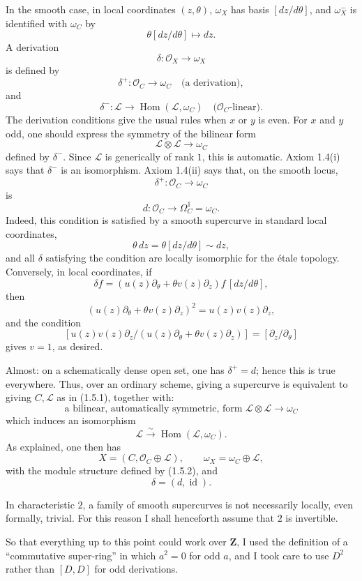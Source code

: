 \documentclass[11pt]{article}
\newcommand{\cO}{\mathcal O}
\newcommand{\cL}{\mathcal L}
\newcommand{\Hom}{\operatorname{Hom}}
\begin{document}
In the smooth case, in local coordinates $(z,\theta)$, $\omega_X$ has basis $[dz/d\theta]$, and $\omega_X^-$ is identified with $\omega_C$ by
\[
  \theta[dz/d\theta]\longmapsto dz.
\]
A derivation
\[
  \delta:\cO_X\longrightarrow\omega_X
\]
is defined by
\[
  \delta^+:\cO_C\longrightarrow\omega_C \quad\text{(a derivation)},
\]
and
\[
  \delta^-:\cL\longrightarrow\Hom(\cL,\omega_C)
  \quad\text{($\cO_C$-linear)}.
\]
The derivation conditions give the usual rules when $x$ or $y$ is even. For $x$ and $y$ odd, one should express the symmetry of the bilinear form
\[
  \cL\otimes\cL\longrightarrow\omega_C
\]
defined by $\delta^-$. Since $\cL$ is generically of rank $1$, this is automatic. Axiom 1.4(i) says that $\delta^-$ is an isomorphism. Axiom 1.4(ii) says that, on the smooth locus,
\[
  \delta^+:\cO_C\longrightarrow\omega_C
\]
is
\[
  d:\cO_C\longrightarrow\Omega_C^1=\omega_C.
\]
Indeed, this condition is satisfied by a smooth supercurve in standard local coordinates,
\[
  \theta\,dz=\theta[dz/d\theta]\sim dz,
\]
and all $\delta$ satisfying the condition are locally isomorphic for the étale topology. Conversely, in local coordinates, if
\[
  \delta f=(u(z)\partial_\theta+\theta v(z)\partial_z)f\,[dz/d\theta],
\]
then
\[
  (u(z)\partial_\theta+\theta v(z)\partial_z)^2=u(z)v(z)\partial_z,
\]
and the condition
\[
  [u(z)v(z)\partial_z/(u(z)\partial_\theta+\theta v(z)\partial_z)]=[\partial_z/\partial_\theta]
\]
gives $v=1$, as desired.

Almost: on a schematically dense open set, one has $\delta^+=d$; hence this is true everywhere. Thus, over an ordinary scheme, giving a supercurve is equivalent to giving $C,\cL$ as in (1.5.1), together with:
\begin{equation}\tag{1.5.2}
  \text{a bilinear, automatically symmetric, form }
  \cL\otimes\cL\longrightarrow\omega_C
\end{equation}
which induces an isomorphism
\[
  \cL\xrightarrow{\sim}\Hom(\cL,\omega_C).
\]
As explained, one then has
\begin{equation}\tag{1.5.3}
  X=(C,\cO_C\oplus\cL),\qquad
  \omega_X=\omega_C\oplus\cL,
\end{equation}
with the module structure defined by (1.5.2), and
\[
  \delta=(d,\operatorname{id}).
\]

In characteristic $2$, a family of smooth supercurves is not necessarily locally, even formally, trivial. For this reason I shall henceforth assume that $2$ is invertible.

So that everything up to this point could work over $\mathbf Z$, I used the definition of a ``commutative super-ring'' in which $a^2=0$ for odd $a$, and I took care to use $D^2$ rather than $[D,D]$ for odd derivations.
\end{document}
